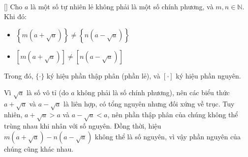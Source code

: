 \documentclass[../02-modular-arithmetic-b.tex]{subfiles}
\begin{document}
\begin{exercise*}\label{example:ROU-2014-MO-G9-P2}[\textbf{}]
    Cho \( a \) là một số tự nhiên lẻ không phải là một số chính phương, và \( m, n \in \mathbb{N} \). Khi đó:

    \begin{itemize}[topsep=0pt, partopsep=0pt, itemsep=0pt]
        \item \( \left\{ m\left( a+\sqrt{a} \right) \right\} \neq \left\{ n\left( a-\sqrt{a} \right) \right\} \)
        \item \( \left[ m\left( a+\sqrt{a} \right) \right] \neq \left[ n\left( a-\sqrt{a} \right) \right] \)
    \end{itemize}

    Trong đó, \( \{\cdot\} \) ký hiệu phần thập phân (phần lẻ), và \( [\cdot] \) ký hiệu phần nguyên.
\end{exercise*}

\begin{remark*}
    Vì \( \sqrt{a} \) là số vô tỉ (do \( a \) không phải là số chính phương), nên các biểu thức \( a+\sqrt{a} \) và \( a-\sqrt{a} \) là liên hợp, có tổng nguyên nhưng đối xứng về trục. Tuy nhiên, \( a+\sqrt{a} > a \) và \( a-\sqrt{a} < a \), nên phần thập phân của chúng không thể trùng nhau khi nhân với số nguyên. Đồng thời, hiệu \( m(a+\sqrt{a}) - n(a-\sqrt{a}) \) không thể là số nguyên, vì vậy phần nguyên của chúng cũng khác nhau.
\end{remark*}
\end{document}
